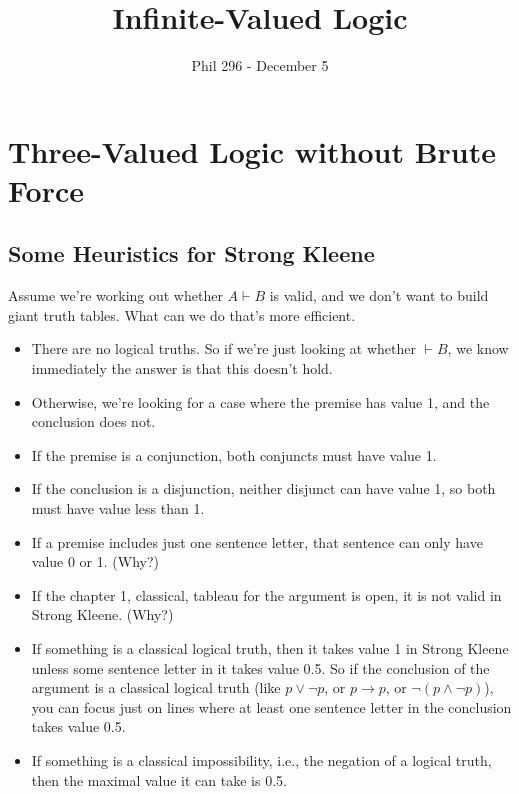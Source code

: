 \documentclass[
]{article}
\title{Infinite-Valued Logic}
\author{Phil 296 - December 5}
\date{}
\providecommand{\tightlist}{%
  \setlength{\itemsep}{0pt}\setlength{\parskip}{0pt}}\usepackage{longtable,booktabs,array}
\begin{document}
\maketitle
\ifdefined\Shaded\renewenvironment{Shaded}{\begin{tcolorbox}[boxrule=0pt, borderline west={3pt}{0pt}{shadecolor}, interior hidden, frame hidden, sharp corners, enhanced, breakable]}{\end{tcolorbox}}\fi

\hypertarget{three-valued-logic-without-brute-force}{%
\section{Three-Valued Logic without Brute
Force}\label{three-valued-logic-without-brute-force}}

\hypertarget{some-heuristics-for-strong-kleene}{%
\subsection{Some Heuristics for Strong
Kleene}\label{some-heuristics-for-strong-kleene}}

Assume we're working out whether \(A \vdash B\) is valid, and we don't
want to build giant truth tables. What can we do that's more efficient.

\begin{itemize}
\tightlist
\item
  There are no logical truths. So if we're just looking at whether
  \(\vdash B\), we know immediately the answer is that this doesn't
  hold.
\item
  Otherwise, we're looking for a case where the premise has value 1, and
  the conclusion does not.
\item
  If the premise is a conjunction, both conjuncts must have value 1.
\item
  If the conclusion is a disjunction, neither disjunct can have value 1,
  so both must have value less than 1.
\item
  If a premise includes just one sentence letter, that sentence can only
  have value 0 or 1. (Why?)
\item
  If the chapter 1, classical, tableau for the argument is open, it is
  not valid in Strong Kleene. (Why?)
\item
  If something is a classical logical truth, then it takes value 1 in
  Strong Kleene unless some sentence letter in it takes value 0.5. So if
  the conclusion of the argument is a classical logical truth (like
  \(p \vee \neg p\), or \(p \rightarrow p\), or
  \(\neg(p \wedge \neg p)\)), you can focus just on lines where at least
  one sentence letter in the conclusion takes value 0.5.
\item
  If something is a classical impossibility, i.e., the negation of a
  logical truth, then the maximal value it can take is 0.5.
\end{itemize}
\end{document}
